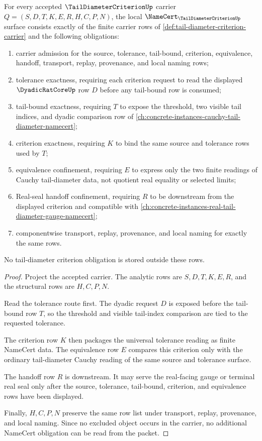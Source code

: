 \begin{theorem}
\label{thm:tail-diameter-criterion-namecert-obligations}
For every accepted $\TailDiameterCriterionUp$ carrier $Q=(S,D,T,K,E,R,H,C,P,N)$, the local $\NameCert_{\TailDiameterCriterionUp}$ surface consists exactly of the finite carrier rows of \autoref{def:tail-diameter-criterion-carrier} and the following obligations:
\begin{enumerate}
\item carrier admission for the source, tolerance, tail-bound, criterion, equivalence, handoff, transport, replay, provenance, and local naming rows;
\item tolerance exactness, requiring each criterion request to read the displayed $\DyadicRatCoreUp$ row $D$ before any tail-bound row is consumed;
\item tail-bound exactness, requiring $T$ to expose the threshold, two visible tail indices, and dyadic comparison row of \autoref{ch:concrete-instances-cauchy-tail-diameter-namecert};
\item criterion exactness, requiring $K$ to bind the same source and tolerance rows used by $T$;
\item equivalence confinement, requiring $E$ to express only the two finite readings of Cauchy tail-diameter data, not quotient real equality or selected limits;
\item Real-seal handoff confinement, requiring $R$ to be downstream from the displayed criterion and compatible with \autoref{ch:concrete-instances-real-tail-diameter-gauge-namecert};
\item componentwise transport, replay, provenance, and local naming for exactly the same rows.
\end{enumerate}
No tail-diameter criterion obligation is stored outside these rows.
\end{theorem}
\begin{proof}
Project the accepted carrier. The analytic rows are $S,D,T,K,E,R$, and the structural rows are $H,C,P,N$.

Read the tolerance route first. The dyadic request $D$ is exposed before the tail-bound row $T$, so the threshold and visible tail-index comparison are tied to the requested tolerance.

The criterion row $K$ then packages the universal tolerance reading as finite NameCert data. The equivalence row $E$ compares this criterion only with the ordinary tail-diameter Cauchy reading of the same source and tolerance surface.

The handoff row $R$ is downstream. It may serve the real-facing gauge or terminal real seal only after the source, tolerance, tail-bound, criterion, and equivalence rows have been displayed.

Finally, $H,C,P,N$ preserve the same row list under transport, replay, provenance, and local naming. Since no excluded object occurs in the carrier, no additional NameCert obligation can be read from the packet.
\end{proof}

